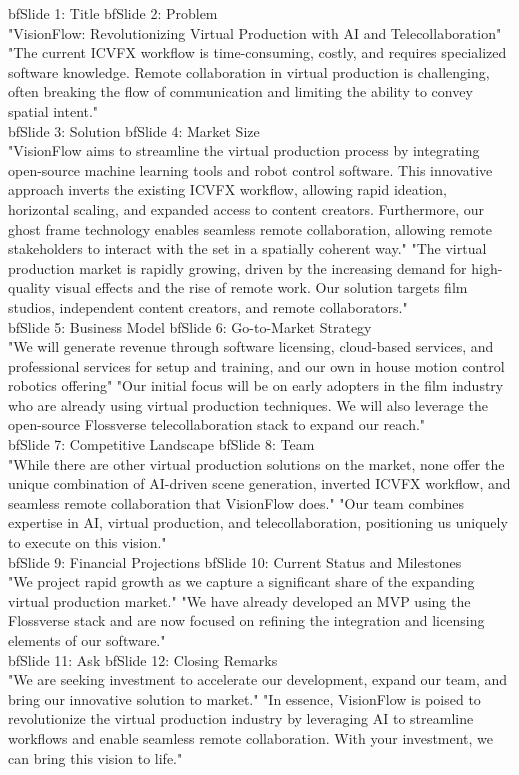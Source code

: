 bf{Slide 1: Title}  bf{Slide 2: Problem} \\
"VisionFlow: Revolutionizing Virtual Production with AI and Telecollaboration"  "The current ICVFX workflow is time-consuming, costly, and requires specialized software knowledge. Remote collaboration in virtual production is challenging, often breaking the flow of communication and limiting the ability to convey spatial intent." \\
bf{Slide 3: Solution}  bf{Slide 4: Market Size} \\
"VisionFlow aims to streamline the virtual production process by integrating open-source machine learning tools and robot control software. This innovative approach inverts the existing ICVFX workflow, allowing rapid ideation, horizontal scaling, and expanded access to content creators. Furthermore, our ghost frame technology enables seamless remote collaboration, allowing remote stakeholders to interact with the set in a spatially coherent way."  "The virtual production market is rapidly growing, driven by the increasing demand for high-quality visual effects and the rise of remote work. Our solution targets film studios, independent content creators, and remote collaborators." \\
bf{Slide 5: Business Model}  bf{Slide 6: Go-to-Market Strategy} \\
"We will generate revenue through software licensing, cloud-based services, and professional services for setup and training, and our own in house motion control robotics offering"  "Our initial focus will be on early adopters in the film industry who are already using virtual production techniques. We will also leverage the open-source Flossverse telecollaboration stack to expand our reach." \\
bf{Slide 7: Competitive Landscape}  bf{Slide 8: Team} \\
"While there are other virtual production solutions on the market, none offer the unique combination of AI-driven scene generation, inverted ICVFX workflow, and seamless remote collaboration that VisionFlow does."  "Our team combines expertise in AI, virtual production, and telecollaboration, positioning us uniquely to execute on this vision." \\
bf{Slide 9: Financial Projections}  bf{Slide 10: Current Status and Milestones} \\
"We project rapid growth as we capture a significant share of the expanding virtual production market."  "We have already developed an MVP using the Flossverse stack and are now focused on refining the integration and licensing elements of our software." \\
bf{Slide 11: Ask}  bf{Slide 12: Closing Remarks} \\
"We are seeking investment to accelerate our development, expand our team, and bring our innovative solution to market."  "In essence, VisionFlow is poised to revolutionize the virtual production industry by leveraging AI to streamline workflows and enable seamless remote collaboration. With your investment, we can bring this vision to life." \\


